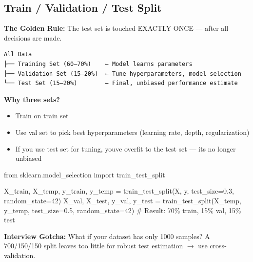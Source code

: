 \documentclass[11pt]{article}
\providecommand{\tightlist}{\setlength{\itemsep}{1pt}\setlength{\parskip}{0pt}}
\newenvironment{Shaded}{\begin{snugshade}}{\end{snugshade}}
\newcommand{\CommentTok}[1]{\textcolor[rgb]{0.48,0.49,0.49}{#1}}
\newcommand{\DecValTok}[1]{\textcolor[rgb]{0.96,0.45,0.00}{#1}}
\newcommand{\FloatTok}[1]{\textcolor[rgb]{0.96,0.45,0.00}{#1}}
\newcommand{\ImportTok}[1]{\textcolor[rgb]{0.15,0.68,0.38}{#1}}
\newcommand{\NormalTok}[1]{\textcolor[rgb]{0.81,0.81,0.76}{#1}}
\newcommand{\OperatorTok}[1]{\textcolor[rgb]{0.81,0.81,0.76}{#1}}
\begin{document}
\subsection{Train / Validation / Test Split}\label{train--validation--test-split}

\textbf{The Golden Rule:} The test set is touched EXACTLY ONCE --- after all decisions are made.

\setcodelang{}

\begin{verbatim}
All Data
├── Training Set (60–70%)    ← Model learns parameters
├── Validation Set (15–20%)  ← Tune hyperparameters, model selection
└── Test Set (15–20%)        ← Final, unbiased performance estimate
\end{verbatim}

\textbf{Why three sets?}

\begin{itemize}
\tightlist
\item
  Train on train set
\item
  Use val set to pick best hyperparameters (learning rate, depth, regularization)
\item
  If you use test set for tuning, you\textquotesingle ve overfit to the test set --- it\textquotesingle s no longer unbiased
\end{itemize}


\begin{Shaded}
\begin{Highlighting}[]
\ImportTok{from}\NormalTok{ sklearn.model\_selection }\ImportTok{import}\NormalTok{ train\_test\_split}

\NormalTok{X\_train, X\_temp, y\_train, y\_temp }\OperatorTok{=}\NormalTok{ train\_test\_split(X, y, test\_size}\OperatorTok{=}\FloatTok{0.3}\NormalTok{, random\_state}\OperatorTok{=}\DecValTok{42}\NormalTok{)}
\NormalTok{X\_val, X\_test, y\_val, y\_test }\OperatorTok{=}\NormalTok{ train\_test\_split(X\_temp, y\_temp, test\_size}\OperatorTok{=}\FloatTok{0.5}\NormalTok{, random\_state}\OperatorTok{=}\DecValTok{42}\NormalTok{)}
\CommentTok{\# Result: 70\% train, 15\% val, 15\% test}
\end{Highlighting}
\end{Shaded}

\textbf{Interview Gotcha:} What if your dataset has only 1000 samples? A 700/150/150 split leaves too little for robust test estimation \(\rightarrow\) use cross-validation.
\end{document}
